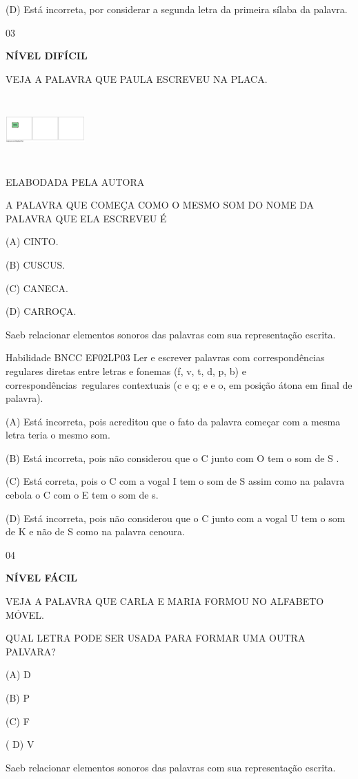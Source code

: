 {{(D) Está incorreta, por considerar a segunda letra da primeira sílaba da
palavra.

\num{03}

\textbf{NÍVEL DIFÍCIL}

VEJA A PALAVRA QUE PAULA ESCREVEU NA PLACA.

\includegraphics[width=1.19861in,height=1.00625in]{media/image176.png}

ELABODADA PELA AUTORA

A PALAVRA QUE COMEÇA COMO O MESMO SOM DO NOME DA PALAVRA QUE ELA
ESCREVEU É

(A) CINTO.

(B) CUSCUS.

(C) CANECA.

(D) CARROÇA.

Saeb relacionar elementos sonoros das palavras com sua representação
escrita.

Habilidade BNCC EF02LP03 Ler e escrever palavras com correspondências
regulares diretas entre letras e fonemas (f, v, t, d, p, b) e
correspondências~regulares contextuais (c e q; e e o, em posição átona
em final de palavra).

(A) Está incorreta, pois acreditou que o fato da palavra começar com a
mesma letra teria o mesmo som.

(B) Está incorreta, pois não considerou que o C junto com O tem o som de
S .

(C) Está correta, pois o C com a vogal I tem o som de S assim como na
palavra cebola o C com o E tem o som de s.

(D) Está incorreta, pois não considerou que o C junto com a vogal U tem
o som de K e não de S como na palavra cenoura.

\num{04}

\textbf{NÍVEL FÁCIL}

VEJA A PALAVRA QUE CARLA E MARIA FORMOU NO ALFABETO MÓVEL.

QUAL LETRA PODE SER USADA PARA FORMAR UMA OUTRA PALVARA?

(A) D

(B) P

(C) F

( D) V

Saeb relacionar elementos sonoros das palavras com sua representação
escrita.

}}
